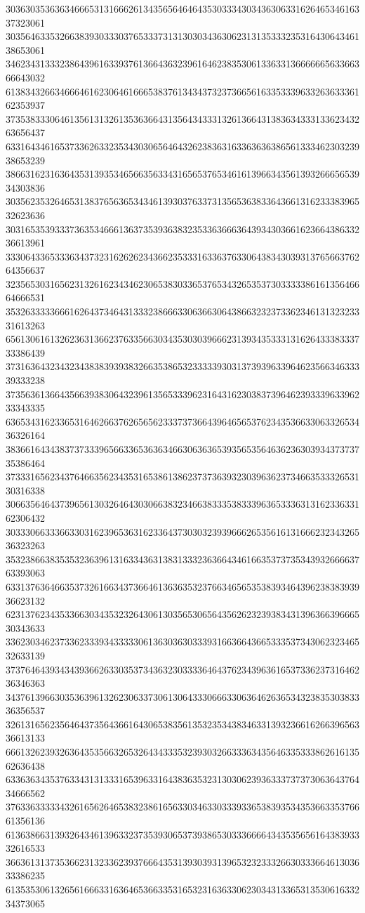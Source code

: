 30363035363634666531316662613435656464643530333430343630633162646534616337323061
30356463353266383930333037653337313130303436306231313533323531643064346138653061
34623431333238643961633937613664363239616462383530613363313666666563366366643032
61383432663466646162306461666538376134343732373665616335333963326363336162353937
37353833306461356131326135363664313564343331326136643138363433313362343263656437
63316434616537336263323534303065646432623836316336363638656133346230323938653239
38663162316364353139353465663563343165653765346161396634356139326665653934303836
30356235326465313837656365343461393037633731356536383364366131623338396532623636
30316535393337363534666136373539363832353363666364393430366162366438633236613961
33306433653336343732316262623436623533316336376330643834303931376566376264356637
32356530316562313261623434623065383033653765343265353730333338616135646664666531
35326333336661626437346431333238666330636630643866323237336234613132323331613263
65613061613262363136623763356630343530303966623139343533313162643338333733386439
37316364323432343838393938326635386532333339303137393963396462356634633339333238
37356361366435663938306432396135653339623164316230383739646239333963396233343335
63653431623365316462663762656562333737366439646565376234353663306332653436326164
38366164343837373339656633653636346630636365393565356463623630393437373735386464
37333165623437646635623435316538613862373736393230396362373466353332653130316338
30663564643739656130326464303066383234663833353833396365333631316233633162306432
30333066333663303162396536316233643730303239396662653561613166623234326536323263
35323866383535323639613163343631383133323636643461663537373534393266663763393063
63313763646635373261663437366461363635323766346565353839346439623838393936623132
62313762343533663034353232643061303565306564356262323938343139636639666530343633
33623034623733623339343333306136303630333931663664366533353734306232346532633139
37376464393434393662633035373436323033336464376234396361653733623731646236346363
34376139663035363961326230633730613064333066633063646263653432383530383336356537
32613165623564643735643661643065383561353235343834633139323661626639656336613133
66613262393263643535663265326434333532393032663336343564633533386261613562636438
63363634353763343131333165396331643836353231303062393633373737306364376434666562
37633633333432616562646538323861656330346330333933653839353435366335376661356136
61363866313932643461396332373539306537393865303336666434353565616438393332616533
36636131373536623132336239376664353139303931396532323332663033366461303633386235
61353530613265616663316364653663353165323163633062303431336531353061633234373065
